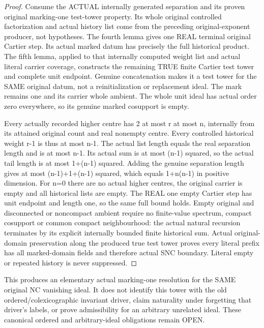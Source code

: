 \begin{proof}
Consume the ACTUAL internally generated separation and its proven original
marking-one test-tower property. Its whole original controlled factorization
and actual history list come from the preceding original-exponent producer,
not hypotheses. The fourth lemma gives one REAL terminal original Cartier
step. Its actual marked datum has precisely the full historical product.
The fifth lemma, applied to that internally computed weight list and actual
literal carrier coverage, constructs the remaining TRUE finite Cartier test
tower and complete unit endpoint. Genuine concatenation makes it a test tower
for the SAME original datum, not a reinitialization or replacement ideal.
The mark remains one and its carrier whole ambient. The whole unit ideal has
actual order zero everywhere, so its genuine marked cosupport is empty.

Every actually recorded higher centre has 2 at most r at most n, internally
from its attained original count and real nonempty centre. Every controlled
historical weight r-1 is thus at most n-1. The actual list length equals the
real separation length and is at most n-1. Its actual sum is at most
(n-1) squared, so the actual tail length is at most 1+(n-1) squared. Adding
the genuine separation length gives at most
(n-1)+1+(n-1) squared, which equals 1+n(n-1) in positive dimension. For n=0
there are no actual higher centres, the original carrier is empty and all
historical lists are empty. The REAL one empty Cartier step has unit endpoint
and length one, so the same full bound holds. Empty original and disconnected
or noncompact ambient require no finite-value spectrum, compact cosupport
or common compact neighbourhood: the actual natural recursion terminates by
its explicit internally bounded finite historical sum. Actual original-domain
preservation along the produced true test tower proves every literal prefix
has all marked-domain fields and therefore actual SNC boundary. Literal empty
or repeated history is never suppressed.
\end{proof}

\begin{remark}
This produces an elementary actual marking-one resolution for the SAME
original NC vanishing ideal. It does not identify this tower with the old
ordered/colexicographic invariant driver, claim naturality under forgetting
that driver's labels, or prove admissibility for an arbitrary unrelated ideal.
These canonical ordered and arbitrary-ideal obligations remain OPEN.
\end{remark}

